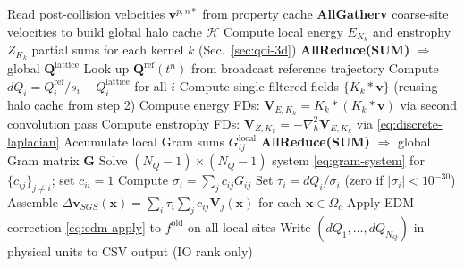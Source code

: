 \documentclass[]{elsarticle}
\begin{document}
\begin{algorithm}
\caption{Single tracking step at time $t^n$}
\label{alg:tracking-step}
\begin{algorithmic}[1]
    \State Read post-collision velocities $\boldsymbol{v}^{p,n*}$ from property cache
    \State \textbf{AllGatherv} coarse-site velocities to build global halo cache $\mathcal{H}$
    \State Compute local energy $E_{K_k}$ and enstrophy $Z_{K_k}$ partial sums for each kernel $k$ \hfill (Sec.~\ref{sec:qoi-3d})
    \State \textbf{AllReduce(SUM)} $\Rightarrow$ global $\boldsymbol{Q}^{\mathrm{lattice}}$
    \State Look up $\boldsymbol{Q}^{\mathrm{ref}}(t^n)$ from broadcast reference trajectory
    \State Compute $dQ_i = Q_i^{\mathrm{ref}} / s_i - Q_i^{\mathrm{lattice}}$ for all $i$
    \State Compute single-filtered fields $\{K_k * \boldsymbol{v}\}$ (reusing halo cache from step 2)
    \State Compute energy FDs: $\mathbf{V}_{E,K_k} = K_k * (K_k * \boldsymbol{v})$ via second convolution pass
    \State Compute enstrophy FDs: $\mathbf{V}_{Z,K_k} = -\nabla^2_h \mathbf{V}_{E,K_k}$ via \eqref{eq:discrete-laplacian}
    \State Accumulate local Gram sums $G_{ij}^{\mathrm{local}}$
    \State \textbf{AllReduce(SUM)} $\Rightarrow$ global Gram matrix $\mathbf{G}$
        \State Solve $(N_Q-1)\times(N_Q-1)$ system \eqref{eq:gram-system} for $\{c_{ij}\}_{j \neq i}$; set $c_{ii}=1$
        \State Compute $\sigma_i = \sum_j c_{ij} G_{ij}$
        \State Set $\tau_i = dQ_i / \sigma_i$ (zero if $|\sigma_i| < 10^{-30}$)
    \EndFor
    \State Assemble $\Delta\boldsymbol{v}_{SGS}(\boldsymbol{x}) = \sum_i \tau_i \sum_j c_{ij} \mathbf{V}_j(\boldsymbol{x})$ for each $\boldsymbol{x} \in \Omega_c$
    \State Apply EDM correction \eqref{eq:edm-apply} to $f^{\mathrm{old}}$ on all local sites
    \State Write $(dQ_1, \ldots, dQ_{N_Q})$ in physical units to CSV output (IO rank only)
\end{algorithmic}
\end{algorithm}
\end{document}
